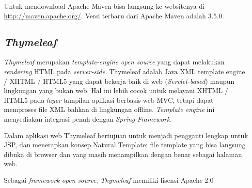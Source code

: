 Untuk mendownload Apache Maven bisa langsung ke websitenya di \url{http://maven.apache.org/}. Versi terbaru dari Apache Maven adalah 3.5.0.

\subsection{\textit{Thymeleaf} \cite{CogoluegnesIntroducing:2013}}
\textit{Thymeleaf} merupakan \textit{template-engine open source} yang dapat melakukan \textit{rendering} HTML pada \textit{server-side}. Thymeleaf adalah Java XML template engine / XHTML / HTML5 yang dapat bekerja baik di web (\textit{Servlet-based}) maupun lingkungan yang bukan web. Hal ini lebih cocok untuk melayani XHTML / HTML5 pada \textit{layer} tampilan aplikasi berbasis web MVC, tetapi dapat memproses file XML bahkan di lingkungan offline. \textit{Template engine} ini menyediakan integrasi penuh dengan \textit{Spring Framework}. 

Dalam aplikasi web Thymeleaf bertujuan untuk menjadi pengganti lengkap untuk JSP, dan menerapkan konsep Natural Template: file template yang bisa langsung dibuka di browser dan yang masih menampilkan dengan benar sebagai halaman web.

Sebagai \textit{framework open source}, \textit{Thymeleaf} memiliki lisensi Apache 2.0 





